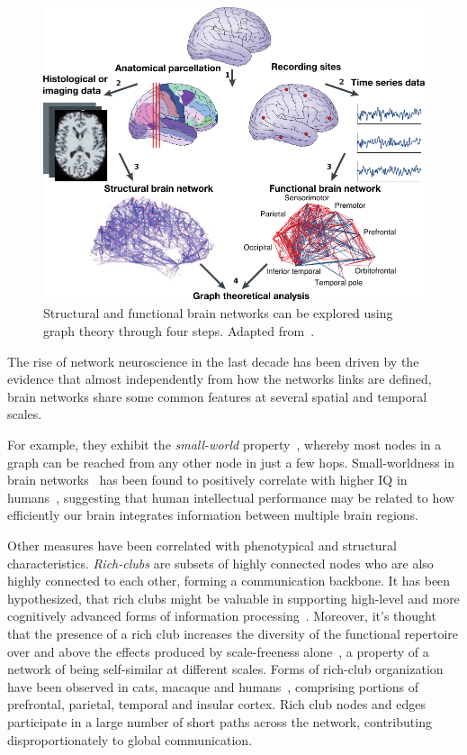 \begin{figure}[htb!]
\centering
\includegraphics[width=1.0\textwidth]{images/bullmore_2009_pipeline.pdf}
\caption{Structural and functional brain networks can be explored using graph theory through four steps.
Adapted from~\cite{bullmore2009}.}
\label{fig:bullmore2009pipeline}
\end{figure}

The rise of network neuroscience in the last decade has been driven by the evidence that almost independently from how the networks links are defined, brain networks share some common features at several spatial and temporal scales.

For example, they exhibit the \emph{small-world} property~\cite{watts1998,sporns2002,sporns2004a}, whereby most nodes in a graph can be reached from any other node in just a few hops.
Small-worldness in brain networks~\cite{vandenheuvel2008} has been found to positively correlate with higher IQ in humans~\cite{vandenheuvel2009}, suggesting that human intellectual performance may be related to how efficiently our brain integrates information between multiple brain regions.

Other measures have been correlated with phenotypical and structural characteristics.
\emph{Rich-clubs} are subsets of highly connected nodes who are also highly connected to each other, forming a communication backbone.
It has been hypothesized, that rich clubs might be valuable in supporting high-level and more cognitively advanced forms of information processing~\cite{collin2014}.
Moreover, it's thought that the presence of a rich club increases the diversity of the functional repertoire over and above the effects produced by scale-freeness alone~\cite{senden2014}, a property of a network of being self-similar at different scales.
Forms of rich-club organization have been observed in cats, macaque and humans~\cite{vandenheuvel2011,harriger2012,dereus2013a,collin2014}, comprising portions of prefrontal, parietal, temporal and insular cortex.
Rich club nodes and edges participate in a large number of short paths across the network, contributing disproportionately to global communication.


